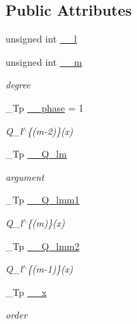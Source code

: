 \subsection*{Public Attributes}
\begin{DoxyCompactItemize}
\item 
unsigned int \hyperlink{struct____gnu__cxx_1_1____assoc__legendre__q__t_ae1e0ac49983366eedefaa69c47761653}{\+\_\+\+\_\+l}
\item 
unsigned int \hyperlink{struct____gnu__cxx_1_1____assoc__legendre__q__t_a795680181e0bc11fbe502be81b04f229}{\+\_\+\+\_\+m}
\begin{DoxyCompactList}\small\item\em degree \end{DoxyCompactList}\item 
\+\_\+\+Tp \hyperlink{struct____gnu__cxx_1_1____assoc__legendre__q__t_a892f2a16f289a979b9a43fd433fdeb8e}{\+\_\+\+\_\+phase} = 1
\begin{DoxyCompactList}\small\item\em Q\+\_\+l$^\wedge$\{(m-\/2)\}(x) \end{DoxyCompactList}\item 
\+\_\+\+Tp \hyperlink{struct____gnu__cxx_1_1____assoc__legendre__q__t_ab794c36700027692a80f19561c57d983}{\+\_\+\+\_\+\+Q\+\_\+lm}
\begin{DoxyCompactList}\small\item\em argument \end{DoxyCompactList}\item 
\+\_\+\+Tp \hyperlink{struct____gnu__cxx_1_1____assoc__legendre__q__t_aa7298c3820fd847db47cc8d9e892ee40}{\+\_\+\+\_\+\+Q\+\_\+lmm1}
\begin{DoxyCompactList}\small\item\em Q\+\_\+l$^\wedge$\{(m)\}(x) \end{DoxyCompactList}\item 
\+\_\+\+Tp \hyperlink{struct____gnu__cxx_1_1____assoc__legendre__q__t_acc5c42714f2e8c5a6c33694eac4b4378}{\+\_\+\+\_\+\+Q\+\_\+lmm2}
\begin{DoxyCompactList}\small\item\em Q\+\_\+l$^\wedge$\{(m-\/1)\}(x) \end{DoxyCompactList}\item 
\+\_\+\+Tp \hyperlink{struct____gnu__cxx_1_1____assoc__legendre__q__t_a2ca6288b875da744fc634f76aafc8ed7}{\+\_\+\+\_\+x}
\begin{DoxyCompactList}\small\item\em order \end{DoxyCompactList}\end{DoxyCompactItemize}


